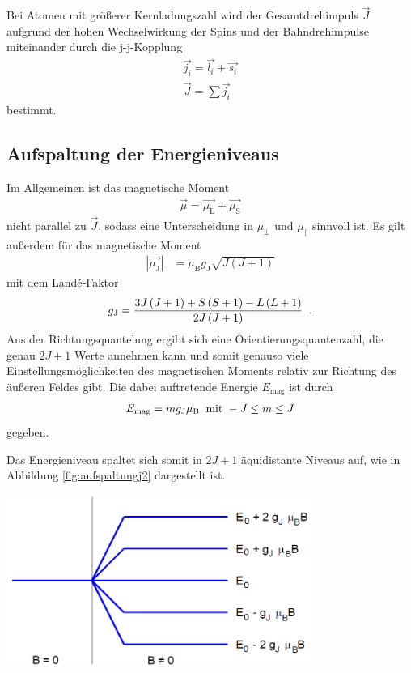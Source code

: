 \documentclass[captions=tableheading]{scrartcl}
\newcommand{\indx}[1]{\text{#1}}
\begin{document}
Bei Atomen mit größerer Kernladungszahl wird der Gesamtdrehimpuls $\vec{J}$ aufgrund der hohen Wechselwirkung der Spins und der Bahndrehimpulse miteinander durch die j-j-Kopplung
\begin{align}
\vec{j_i}=\vec{l_i}+\vec{s_i} \\
\vec{J}=\sum \vec{j_i}
\end{align}
bestimmt.
\subsection{Aufspaltung der Energieniveaus}
Im Allgemeinen ist das magnetische Moment
\begin{align}
\vec{\mu}=\vec{\mu_\indx{L}}+\vec{\mu_\indx{S}}
\end{align}
nicht parallel zu $\vec{J}$, sodass eine Unterscheidung in $\mu_{\perp}$ und $\mu_{\parallel}$ sinnvoll ist.
Es gilt außerdem für das magnetische Moment
\begin{align}
\left| \vec{\mu_\indx{J}} \right| &=\mu_\indx{B}g_\indx{J} \sqrt{J\left(J+1\right)}
\end{align}
mit dem Land\'{e}-Faktor
\begin{align}
g_\indx{J}=\frac{3J\left(J+1\right)+S\left(S+1\right)-L\left(L+1\right)}{2J\left(J+1\right)}\hspace{0.2cm}\text{.}
\end{align}
Aus der Richtungsquantelung ergibt sich eine Orientierungsquantenzahl, die genau $2J+1$ Werte annehmen kann und somit genauso viele Einstellungsmöglichkeiten des magnetischen Moments relativ zur Richtung des äußeren Feldes gibt.
Die dabei auftretende Energie $E_\indx{mag}$ ist durch
\begin{align}
E_\indx{mag}=mg_\indx{J}\mu_\indx{B}\hspace{0.2cm}\text{mit }-J\le m \le J 
\end{align}
gegeben.

Das Energieniveau spaltet sich somit in $2J+1$ äquidistante Niveaus auf, wie in Abbildung \ref{fig:aufspaltungj2} dargestellt ist.

\begin{center}
	\includegraphics[width=10cm]{images/aufspaltungj2.png}
	\label{fig:aufspaltungj2}
\end{center}
\end{document}
